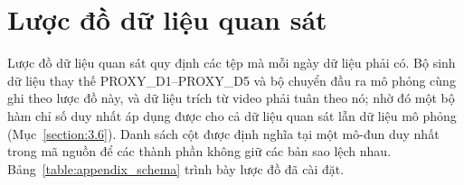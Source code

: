 \documentclass[../main.tex]{subfiles}
\begin{document}
\section{Lược đồ dữ liệu quan sát}
\label{section:appendix_schema}

Lược đồ dữ liệu quan sát quy định các tệp mà mỗi ngày dữ liệu phải có. Bộ sinh dữ liệu thay thế PROXY\_D1--PROXY\_D5 và bộ chuyển đầu ra mô phỏng cùng ghi theo lược đồ này, và dữ liệu trích từ video phải tuân theo nó; nhờ đó một bộ hàm chỉ số duy nhất áp dụng được cho cả dữ liệu quan sát lẫn dữ liệu mô phỏng (Mục~\ref{section:3.6}). Danh sách cột được định nghĩa tại một mô-đun duy nhất trong mã nguồn để các thành phần không giữ các bản sao lệch nhau. Bảng~\ref{table:appendix_schema} trình bày lược đồ đã cài đặt.
\end{document}
